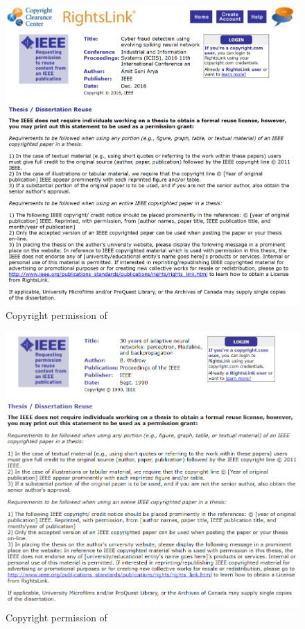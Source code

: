 \begin{figure}
	\centering
	\includegraphics[width=0.8\linewidth]{fig/copyrights/ieee_iciis.PNG}
	\caption{Copyright permission of \citet{arya2016cyber}}
\end{figure}

\begin{figure}
	\centering
	\includegraphics[width=0.8\linewidth]{fig/copyrights/widrow1990.PNG}
	\caption{Copyright permission of \citet{widrow199030}}
\end{figure}

